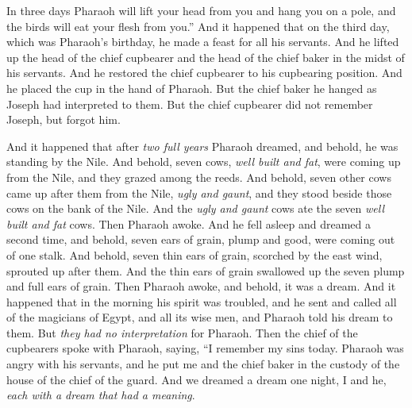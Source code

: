 \begin{biblechapter}
\verse In three days Pharaoh will lift your head from you and hang you on a pole, and the birds will eat your flesh from you.”
\verse And it happened that on the third day, which was Pharaoh’s birthday, he made a feast for all his servants. And he lifted up the head of the chief cupbearer and the head of the chief baker in the midst of his servants.
\verse And he restored the chief cupbearer to his cupbearing position. And he placed the cup in the hand of Pharaoh.
\verse But the chief baker he hanged as Joseph had interpreted to them.
\verse But the chief cupbearer did not remember Joseph, but forgot him.
\end{biblechapter}

\begin{biblechapter} %
 And it happened that after \textit{two full years} Pharaoh dreamed, and behold, he was standing by the Nile.
\verse And behold, seven cows, \textit{well built and fat}, were coming up from the Nile, and they grazed among the reeds.
\verse And behold, seven other cows came up after them from the Nile, \textit{ugly and gaunt}, and they stood beside those cows on the bank of the Nile.
\verse And the \textit{ugly and gaunt} cows ate the seven \textit{well built and fat} cows. Then Pharaoh awoke.
\verse And he fell asleep and dreamed a second time, and behold, seven ears of grain, plump and good, were coming out of one stalk.
\verse And behold, seven thin ears of grain, scorched by the east wind, sprouted up after them.
\verse And the thin ears of grain swallowed up the seven plump and full ears of grain. Then Pharaoh awoke, and behold, it was a dream.
\verse And it happened that in the morning his spirit was troubled, and he sent and called all of the magicians of Egypt, and all its wise men, and Pharaoh told his dream to them. But \textit{they had no interpretation} for Pharaoh.
\verse Then the chief of the cupbearers spoke with Pharaoh, saying, “I remember my sins today.
\verse Pharaoh was angry with his servants, and he put me and the chief baker in the custody of the house of the chief of the guard.
\verse And we dreamed a dream one night, I and he, \textit{each with a dream that had a meaning}.

\end{biblechapter}
